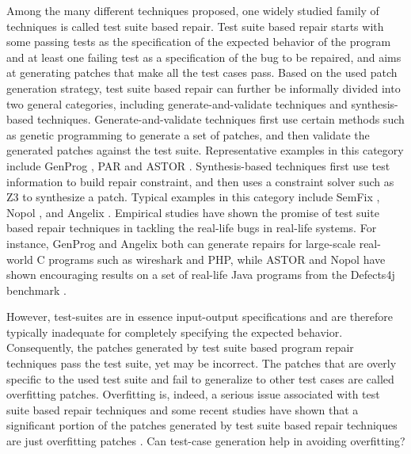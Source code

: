 \documentclass[]{sig-alternate}
\begin{document}
Among the many different techniques proposed, one widely studied family of techniques is called test suite based repair. Test suite based repair starts with some passing tests as the specification of the expected behavior of the program and at least one failing test as a specification of the bug to be repaired, and aims at generating patches that make all the test cases pass. Based on the used patch generation strategy, test suite based repair can further be informally divided into two general categories, including generate-and-validate techniques and synthesis-based techniques. Generate-and-validate techniques first use certain methods such as genetic programming to generate a set of patches, and then validate the generated patches against the test suite. Representative examples in this category include GenProg \cite{genprog}, PAR \cite{kim2013automatic} and ASTOR \cite{astor2016}. Synthesis-based techniques first use test information to build repair constraint, and then uses a constraint solver such as Z3 to synthesize a patch. Typical examples in this category include SemFix \cite{semfix}, Nopol \cite{nopol}, and Angelix \cite{Mechtaev:2016:ASM:2884781.2884807}. Empirical studies have shown the promise of test suite based repair techniques in tackling the real-life bugs in real-life systems. For instance, GenProg \cite{genprog} and Angelix \cite{Mechtaev:2016:ASM:2884781.2884807} both can generate repairs for large-scale real-world C programs such as wireshark and PHP, while ASTOR \cite{astor2016} and Nopol \cite{nopol} have shown encouraging results \cite{defects4j-repair} on a set of real-life Java programs from the Defects4j benchmark \cite{JustJE2014}.

However, test-suites are in essence input-output specifications and are therefore typically inadequate for completely specifying the expected behavior.
Consequently, the patches generated by test suite based program repair techniques pass the test suite, yet may be incorrect. The patches that are overly specific to the used test suite and fail to generalize to other test cases are called overfitting patches. Overfitting is, indeed, a serious issue associated with test suite based repair techniques and some recent studies have shown that a significant portion of the patches generated by test suite based repair techniques are just overfitting patches \cite{smith2015cure,qi2015efficient,defects4j-repair}. Can test-case generation help in avoiding overfitting?
\end{document}
